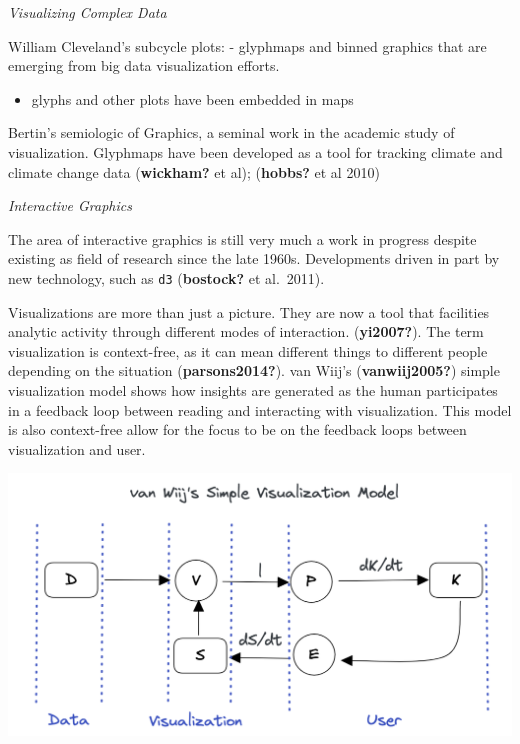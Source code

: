 \documentclass[print]{nuthesis}
\providecommand{\tightlist}{%
  \setlength{\itemsep}{0pt}\setlength{\parskip}{0pt}}
\begin{document}
\emph{Visualizing Complex Data}

William Cleveland's subcycle plots:
- glyphmaps and binned graphics that are emerging from big data visualization efforts.

\begin{itemize}
\tightlist
\item
  glyphs and other plots have been embedded in maps
\end{itemize}

Bertin's semiologic of Graphics, a seminal work in the academic study of visualization. Glyphmaps have been developed as a tool for tracking climate and climate change data (\textbf{wickham?} et al); (\textbf{hobbs?} et al 2010)

\emph{Interactive Graphics}

The area of interactive graphics is still very much a work in progress despite existing as field of research since the late 1960s. Developments driven in part by new technology, such as \texttt{d3} (\textbf{bostock?} et al.~2011).

Visualizations are more than just a picture. They are now a tool that facilities analytic activity through different modes of interaction. (\textbf{yi2007?}). The term visualization is context-free, as it can mean different things to different people depending on the situation (\textbf{parsons2014?}). van Wiij's (\textbf{vanwiij2005?}) simple visualization model shows how insights are generated as the human participates in a feedback loop between reading and interacting with visualization. This model is also context-free allow for the focus to be on the feedback loops between visualization and user.

\begin{center}
\includegraphics[width=\textwidth]{figure/vanWiijSimpleModel}
\end{center}
\end{document}
